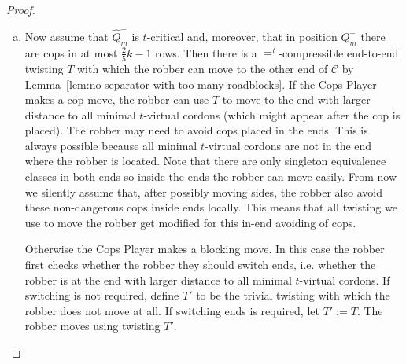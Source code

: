 \documentclass[a4paper,english, thm-restate]{lipics-v2021}
\newcommand{\comp}{\equiv}
\newcommand{\grid}{\mathcal{C}}
\begin{document}
\begin{proof}
\begin{claimproof}
\begin{enumerate}[(a)]
			This is straightforward to see if the Cops Player makes a cop move.
			We just follow the strategy in the non-blocking game in position $\hat{Q}_m^-$ to ensure this distance~\cite[Proof of Theorem 4.1]{RFJN024}.
			The robber moves to the end with larger distance to all the $t$-virtual cordons. Since different minimal $t$-virtual cordons can have distance at most $O(k)$~\cite{RFJN024},
			one end has distance at least $J/2 - O(k)$ to these $t$-virtual cordons.
			 Otherwise, the Cops Player makes a blocking move.
			Let $N$ be the announced roadblock on a $\comp^t$\nobreakdash-equivalence class $C$. Moreover, imagine that in the non-blocking game a cop is announced for $C$; then the robber responds with some appropriate $\comp^t$\nobreakdash-compressible twisting---which we denote by $T$---according to the robber's strategy. Call the resulting position in the non-blocking game $Q$,
			in which the robber again has distance $O(J)$ to all $t$-virtual cordons.
			The robber moves using $T$ also in the blocking game.
			If $T$ uses $N$ a cop is placed on $C$
			and the resulting position is $Q_{m+1}$.
			 But observe that $\hat{Q}_{m+1}$ is identical to $Q$.
			Otherwise, $T$ avoids $N$. Then a roadblock is placed and 
			again, the resulting position $Q_{m+1}$ is such that $\hat{Q}_{m+1}$ is 
			identical to $Q$.
			
			
			\item Now assume that $\hat{Q}_m^-$ is $t$-critical and, moreover, that
			 in position $Q_m^-$ there are cops in at most $\frac{2}{5}k-1$ rows.
			Then there is a $\comp^t$-compressible end-to-end twisting $T$
			with which the robber can move to the other end of $\grid$
			by Lemma~\ref{lem:no-separator-with-too-many-roadblocks}.
			If the Cops Player makes a cop move,
			the robber can use $T$ to move to the end with larger distance to all minimal $t$-virtual cordons (which might appear after the cop is placed).
			The robber may need to avoid cops placed in the ends.
			This is always possible because all minimal $t$-virtual cordons are not in the end where the robber is located.
			Note that there are only singleton equivalence classes in both ends so inside the ends the robber can move easily.
			From now we silently assume that, after possibly moving sides,
			the robber also avoid these non-dangerous cops inside ends locally.
			This means that all twisting we use to move the robber get modified for this in-end avoiding of cops. 
			
			Otherwise the Cops Player makes a blocking move. In this case
			the robber first checks whether the robber they should switch ends, i.e. whether the robber is at the end with larger distance to all minimal $t$-virtual cordons.
			If switching is not required, 
			define $T'$ to be the trivial twisting with which the robber does not move at all.
			If switching ends is required, let $T' := T$.
			The robber moves using twisting $T'$.
			

\end{enumerate}
\end{claimproof}
\end{proof}
\end{document}
